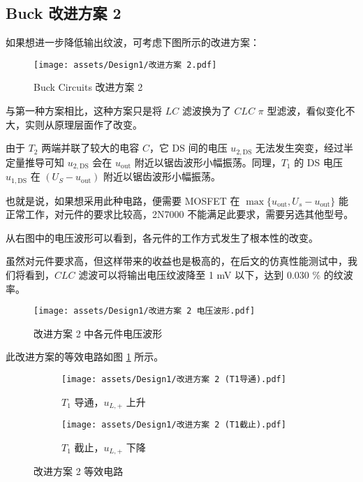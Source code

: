 \documentclass[UTF8]{article}
\theoremstyle{MyLineTheoremStyle} %
\theoremstyle{MyBlockTheoremStyle} %
\theoremstyle{MySubsubsectionStyle} %
\begin{document}
\subsection{Buck 改进方案 2}
如果想进一步降低输出纹波，可考虑下图所示的改进方案：
\begin{figure}[H]\centering
    \texttt{[image: assets/Design1/改进方案 2.pdf]}
    \caption{Buck Circuits 改进方案 2}
\end{figure}

\begin{center}
\noindent\begin{minipage}{0.42\columnwidth}
    \hspace*{2em} 与第一种方案相比，这种方案只是将 $LC$ 滤波换为了 $CLC$ $\pi$ 型滤波，看似变化不大，实则从原理层面作了改变。
    
    \hspace*{2em} 由于 $T_2$ 两端并联了较大的电容 $C$，它 DS 间的电压 $u_{2, \text{DS}}$ 无法发生突变，经过半定量推导可知 $u_{2, \text{DS}}$ 会在 $u_{\text{out}}$ 附近以锯齿波形小幅振荡。同理，$T_1$ 的 DS 电压 $u_{1, \text{DS}}$ 在 $(U_S - u_{\text{out}})$ 附近以锯齿波形小幅振荡。
    
    \hspace*{2em} 也就是说，如果想采用此种电路，便需要 MOSFET 在  $\max \{u_{\text{out}} , U_s - u_{\text{out}}\}$ 能正常工作，对元件的要求比较高，2N7000 不能满足此要求，需要另选其他型号。
    
    \hspace*{2em} 从右图中的电压波形可以看到，各元件的工作方式发生了根本性的改变。

    \hspace*{2em} 虽然对元件要求高，但这样带来的收益也是极高的，在后文的仿真性能测试中，我们将看到，$CLC$ 滤波可以将输出电压纹波降至 1 mV 以下，达到 0.030   \% 的纹波率。
    \hspace*{2em} 
\end{minipage}\hspace*{8mm}\begin{minipage}{0.45\columnwidth}
    \begin{figure}[H]\centering
        \texttt{[image: assets/Design1/改进方案 2 电压波形.pdf]}
        \caption{改进方案 2 中各元件电压波形}
    \end{figure}
\end{minipage}\end{center}

此改进方案的等效电路如图 \ref{改进方案 2 等效电路} 所示。
\begin{figure}[H]\centering
\begin{subfigure}[b]{0.5\columnwidth}\centering
    \texttt{[image: assets/Design1/改进方案 2 (T1导通).pdf]}
    \caption{$T_1$ 导通，$u_{L, +}$ 上升}
\end{subfigure}\hfill
\begin{subfigure}[b]{0.5\columnwidth}\centering
    \texttt{[image: assets/Design1/改进方案 2 (T1截止).pdf]}
    \caption{$T_1$ 截止，$u_{L, +}$ 下降}
\end{subfigure}
\caption{改进方案 2 等效电路}
\label{改进方案 2 等效电路}
\end{figure}
\end{document}
